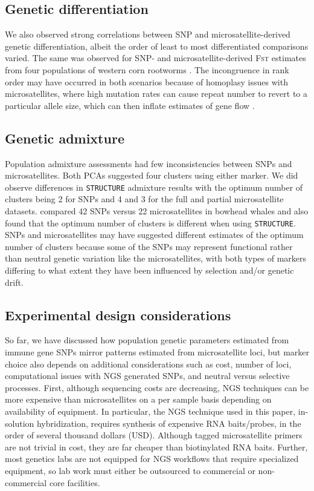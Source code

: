\documentclass[english]{article}\usepackage[]{graphicx}\usepackage[]{color}
\begin{document}
\subsection*{Genetic differentiation}
We also observed strong correlations between SNP and microsatellite-derived genetic differentiation, albeit the order of least to most differentiated comparisons varied. The same was observed for SNP- and microsatellite-derived \textsc{Fst} estimates from four populations of western corn rootworms \citep{Coates_et_al_2009}. The incongruence in rank order may have occurred in both scenarios because of homoplasy issues with microsatellites, where high mutation rates can cause repeat number to revert to a particular allele size, which can then inflate estimates of gene flow \citep{Coates_et_al_2009}.

\subsection*{Genetic admixture}
Population admixture assessments had few  inconsistencies between SNPs and microsatellites. Both PCAs suggested four clusters using either marker. We did observe differences in \texttt{STRUCTURE} admixture results with the optimum number of clusters being 2 for SNPs and 4 and 3 for the full and partial microsatellite datasets. \citet{Morin_et_al_2012} compared 42 SNPs versus 22 microsatellites in bowhead whales and also found that the optimum number of clusters is different when using \texttt{STRUCTURE}. SNPs and microsatellites may have suggested different estimates of the optimum number of clusters because some of the SNPs may represent functional rather than neutral genetic variation like the microsatellites, with both types of markers differing to what extent they have been influenced by selection and/or genetic drift.

\subsection*{Experimental design considerations}
So far, we have discussed how population genetic parameters estimated from immune gene SNPs mirror patterns estimated from microsatellite loci, but marker choice also depends on additional considerations such as cost, number of loci, computational issues with NGS generated SNPs, and neutral versus selective processes. First, although sequencing costs are decreasing, NGS techniques can be more expensive than microsatellites on a per sample basis depending on availability of equipment. In particular, the NGS technique used in this paper, in-solution hybridization, requires synthesis of expensive RNA baits/probes, in the order of several thousand dollars (USD). Although tagged microsatellite primers are not trivial in cost, they are far cheaper than biotinylated RNA baits. Further, most genetics labs are not equipped for NGS workflows that require specialized equipment, so lab work must either be outsourced to commercial or non-commercial core facilities.
\end{document}

